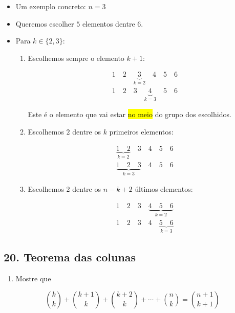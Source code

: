 \documentclass[
  11pt]{report}
\providecommand{\tightlist}{%
  \setlength{\itemsep}{0pt}\setlength{\parskip}{0pt}}
\begin{document}
\begin{itemize}
\item
  Um exemplo concreto: $n = 3$
\item
  Queremos escolher $5$ elementos dentre $6$.
\item
  Para $k \in \{ 2, 3 \}$:

  \begin{enumerate}
  \def\labelenumi{\arabic{enumi}.}
  \item
    Escolhemos sempre o elemento $k + 1$:

    \[
    \begin{aligned}
    1 \quad 2 \quad \underbrace{3}_{k = 2} \quad 4 \quad 5 \quad 6 \\
    1 \quad 2 \quad 3 \quad \underbrace{4}_{k = 3} \quad 5 \quad 6
    \end{aligned}
    \]

    Este é o elemento que vai estar {\hl{no meio}} do grupo dos escolhidos.
  \item
    Escolhemos $2$ dentre os $k$ primeiros elementos:

    \[
    \begin{aligned}
    \underbrace{1 \quad 2}_{k = 2} \quad 3 \quad 4 \quad 5 \quad 6 \\
    \underbrace{1 \quad 2 \quad 3}_{k = 3} \quad 4 \quad 5 \quad 6
    \end{aligned}
    \]
  \item
    Escolhemos $2$ dentre os $n - k + 2$ últimos elementos:

    \[
    \begin{aligned}
    1 \quad 2 \quad 3 \quad \underbrace{4 \quad 5 \quad 6}_{k = 2}\\
    1 \quad 2 \quad 3 \quad 4 \quad \underbrace{5 \quad 6}_{k = 3}
    \end{aligned}
    \]
  \end{enumerate}
\end{itemize}

\hypertarget{teorema-das-colunas}{%
\subsection*{20. Teorema das colunas}\label{teorema-das-colunas}}

\begin{rmdbox}

\begin{enumerate}
\def\labelenumi{(\alph{enumi})}
\tightlist
\item
  Mostre que
\end{enumerate}

\[
\binom{k}{k} + \binom{k + 1}{k} + \binom{k + 2}{k} + \cdots + 
\binom{n}{k} = \binom{n + 1}{k + 1}
\]

\end{rmdbox}
\end{document}

